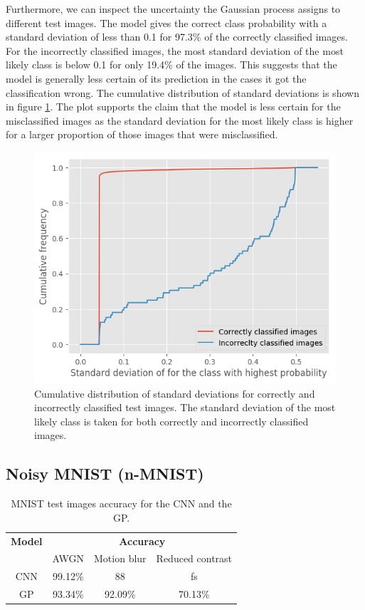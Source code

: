 \documentclass{article}
\begin{document}
Furthermore, we can inspect the uncertainty the Gaussian process assigns to different test images. The model gives the correct class probability with a standard deviation of less than 0.1 for 97.3\% of the correctly classified images. For the incorrectly classified images, the most standard deviation of the most likely class is below 0.1 for only 19.4\% of the images. This suggests that the model is generally less certain of its prediction in the cases it got the classification wrong. The cumulative distribution of standard deviations is shown in figure \ref{fig/mnist_cum_stds}. The plot supports the claim that the model is less certain for the misclassified images as the standard deviation for the most likely class is higher for a larger proportion of those images that were misclassified.
\begin{figure}[h]
	\centering
	\includegraphics[scale=0.5]{mnist_cum_stds}
	\caption{Cumulative distribution of standard deviations for correctly and incorrectly classified test images. The standard deviation of the most likely class is taken for both correctly and incorrectly classified images.}
	\label{fig/mnist_cum_stds}
\end{figure}

\subsection{Noisy MNIST (n-MNIST) \cite{DBLP:journals/corr/BasuKGDMN15}}
\begin{table}[h]
\centering	
\begin{tabular}{ c | c c c}
\textbf{Model} & \multicolumn{3}{c}{\textbf{Accuracy}}\\
& AWGN & Motion blur & Reduced contrast\\
\hline
CNN & 99.12\% & 88 & fs\\
GP & 93.34\%  & 92.09\% & 70.13\%\\
\end{tabular}
\caption{MNIST test images accuracy for the CNN and the GP.}
\label{table/noisy_mnist_acc}
\end{table}
\end{document}
